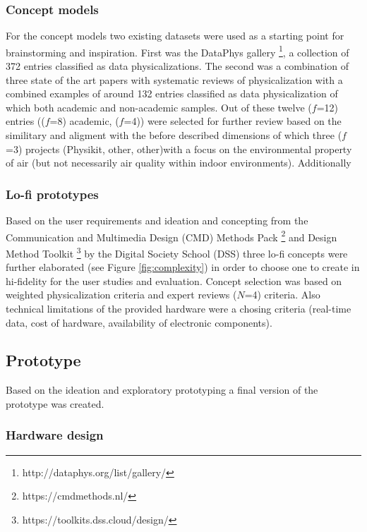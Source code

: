 \subsubsection{Concept models}

For the concept models two existing datasets were used as a starting point for brainstorming and inspiration. First was the DataPhys gallery \footnote{http://dataphys.org/list/gallery/}, a collection of 372 entries classified as data physicalizations. The second was a combination of three state of the art papers with systematic reviews of physicalization with a combined examples of around 132 entries classified as data physicalization of which both academic and non-academic samples. Out of these twelve ($f$=12) entries (($f$=8) academic, ($f$=4)) were selected for further review based on the similitary and aligment with the  before described dimensions of which three ($f$=3) projects (Physikit, other, other)with a focus on the environmental property of air (but not necessarily air quality within indoor environments). Additionally 

\subsubsection{Lo-fi prototypes}

Based on the user requirements and ideation and concepting  from the Communication and Multimedia Design (CMD) Methods Pack \footnote{https://cmdmethods.nl/} and Design Method Toolkit \footnote{https://toolkits.dss.cloud/design/} by the Digital Society School (DSS) three lo-fi concepts were further elaborated (see Figure \ref{fig:complexity}) in order to choose one to create in hi-fidelity for the user studies and evaluation. Concept selection was based on weighted physicalization criteria and expert reviews ($N$=4) criteria. Also technical limitations of the provided hardware were a chosing criteria (real-time data, cost of hardware, availability of electronic components).


\subsection{Prototype}

Based on the ideation and exploratory prototyping a final version of the prototype was created.

\subsubsection{Hardware design }

